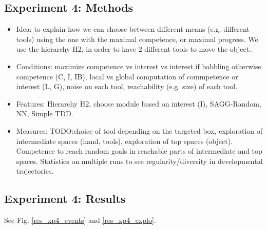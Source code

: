 \documentclass[conference]{include/IEEEtran}
\begin{document}
	\subsection{Experiment 4: Methods}	
		
		\begin{itemize}
			\item Idea: to explain how we can choose between different means (e.g. different tools) using the one with the maximal competence, or maximal progress.
					We use the hierarchy H2, in order to have 2 different tools to move the object.
			
			\item Conditions: maximize competence vs interest vs interest if babbling otherwise competence (C, I, IB), local vs global computation of commpetence or interest (L, G), noise on each tool, reachability (e.g. size) of each tool.
			
			\item Features: Hierarchy H2, choose module based on interest (I), SAGG-Random, NN, Simple TDD.
			
			\item Measures: TODO:choice of tool depending on the targeted box, exploration of intermediate spaces (hand, tools), exploration of top spaces (object). Competence to reach random goals in reachable parts of intermediate and top spaces. 
					Statistics on multiple runs to see regularity/diversity in developmental trajectories.
		\end{itemize}
		

	\subsection{Experiment 4: Results}
	
		See Fig. \ref{res_xp4_events} and \ref{res_xp4_explo}.
		
		
\end{document}
